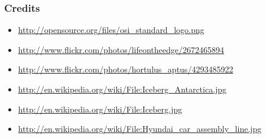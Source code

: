 \documentclass[18pt]{beamer}
\begin{document}
\begin{frame}
\frametitle{Credits}
\begin{itemize}
\item \url{http://opensource.org/files/osi_standard_logo.png}
\item \url{http://www.flickr.com/photos/lifeontheedge/2672465894}
\item \url{http://www.flickr.com/photos/hortulus_aptus/4293485922}
\item \url{http://en.wikipedia.org/wiki/File:Iceberg_Antarctica.jpg}
\item \url{http://en.wikipedia.org/wiki/File:Iceberg.jpg}
\item \url{http://en.wikipedia.org/wiki/File:Hyundai_car_assembly_line.jpg}
\end{itemize}
\end{frame}
\end{document}
